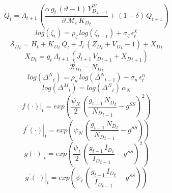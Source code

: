 \documentclass[10pt,a4paper]{article}
\begin{document}
\begin{dmath}
{Q}_{t}={\Lambda}_{t+1}\, \left(\frac{\alpha\, {g}_{t}\, \left(\vartheta-1\right)\, {Y^W_D}_{t+1}}{\vartheta\, {\mathcal{M}}_{t}\, {K_D}_{t}}+\left(1-\delta\right)\, {Q}_{t+1}\right)
\end{dmath}
\begin{dmath}
log\left({\zeta}_{t}\right)={{\rho}_{\zeta}}\, log\left({\zeta}_{t-1}\right)+{{\sigma}_{\zeta}}\, {\epsilon}^{\chi}_{t}
\end{dmath}
\begin{dmath}
{\mathcal{S}_{D}}_{t}={H}_{t}+{K_D}_{t}\, {Q}_{t}+{J}_{t}\, \left({Z_D}_{t}+{V_D}_{t}-1\right)+{X_D}_{t}
\end{dmath}
\begin{dmath}
{X_D}_{t}={g}_{t}\, {\Lambda}_{t+1}\, \left({J}_{t+1}\, {V_D}_{t+1}+{X_D}_{t+1}\right)
\end{dmath}
\begin{dmath}
{\mathcal{R}_{D}}_{t}={N_D}_{t}
\end{dmath}
\begin{dmath}
log\left({\Delta^N}_{t}\right)={\rho}_n\, log\left({\Delta^N}_{t-1}\right)-{\sigma}_n\, {\epsilon}^n_{t}
\end{dmath}
\begin{dmath}
log\left({\Delta^M}_{t}\right)=log\left({\Delta^N}_{t}\right)\, \alpha_N
\end{dmath}
\begin{dmath}
{\left.       f\left( \cdot \right)            \right|}_{t}=exp\left(\frac{{\psi_N}}{2}\, \left(\frac{{g}_{t-1}\, {N_D}_{t}}{{N_D}_{t-1}}-{g^{SS}}\right)^{2}\right)
\end{dmath}
\begin{dmath}
{\left.       f^{\prime}\left( \cdot \right)   \right|}_{t}=exp\left({\psi_N}\, \left(\frac{{g}_{t-1}\, {N_D}_{t}}{{N_D}_{t-1}}-{g^{SS}}\right)\right)
\end{dmath}
\begin{dmath}
{\left.       g\left( \cdot \right)            \right|}_{t}=exp\left(\frac{{\psi_I}}{2}\, \left(\frac{{g}_{t-1}\, {I_D}_{t}}{{I_D}_{t-1}}-{g^{SS}}\right)^{2}\right)
\end{dmath}
\begin{dmath}
{\left.       g^{\prime}\left( \cdot \right)   \right|}_{t}=exp\left({\psi_I}\, \left(\frac{{g}_{t-1}\, {I_D}_{t}}{{I_D}_{t-1}}-{g^{SS}}\right)\right)
\end{dmath}
\end{document}
